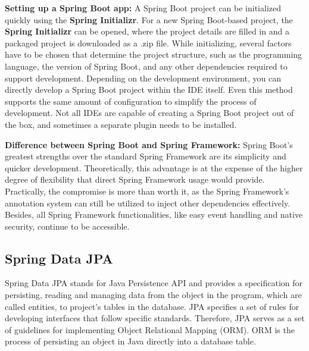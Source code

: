         \blankLine

    \textbf{Setting up a Spring Boot app:} \newline
    A Spring Boot project can be initialized quickly using the \textbf{Spring Initializr}. For a new Spring Boot-based project, the \textbf{Spring Initializr} can be opened, where the project details are filled in and a packaged project is downloaded as a .zip file. While initializing, several factors have to be chosen that determine the project structure, such as the programming language, the version of Spring Boot, and any other dependencies required to support development. \newline
    Depending on the development environment, you can directly develop a Spring Boot project within the IDE itself. Even this method supports the same amount of configuration to simplify the process of development. Not all IDEs are capable of creating a Spring Boot project out of the box, and sometimes a separate plugin needs to be installed. \Autocite{Andi:SpringInit}
    
    \blankLine

    \textbf{Difference between Spring Boot and Spring Framework:} \newline
    Spring Boot's greatest strengths over the standard Spring Framework are its simplicity and quicker development. Theoretically, this advantage is at the expense of the higher degree of flexibility that direct Spring Framework usage would provide. Practically, the compromise is more than  worth it, as the Spring Framework's annotation system can still be utilized to inject other dependencies effectively. Besides, all Spring Framework functionalities, like easy event handling and native security, continue to be accessible. \Autocite{Andi:SpringBoot2}
    
    \subsection{Spring Data JPA}
    Spring Data JPA stands for Java Persistence API and provides a specification for persisting, reading and managing data from the object in the program, which are called entities, to project's tables in the database. JPA specifies a set of rules for developing interfaces that follow specific standards. Therefore, JPA serves as a set of guidelines for implementing Object Relational Mapping (ORM). 
    ORM is the process of persisting an object in Java directly into a database table.

    \blankLine
    
